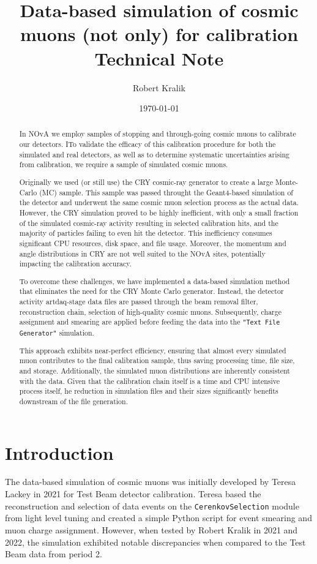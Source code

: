 \documentclass[12pt]{article}
\author{Robert Kralik}
\title{\textbf{Data-based simulation of cosmic muons (not only) for calibration\\ \vspace*{5mm}
\Large{Technical Note}}}
\date{\today}
\begin{document}
\maketitle
\begin{abstract}
In NOvA we employ samples of stopping and through-going cosmic muons to calibrate our detectors. ITo validate the efficacy of this calibration procedure for both the simulated and real detectors, as well as to determine systematic uncertainties arising from calibration, we require a sample of simulated cosmic muons.

Originally we used (or still use) the CRY cosmic-ray generator to create a large Monte-Carlo (MC) sample. This sample was passed throught the Geant4-based simulation of the detector and underwent the same cosmic muon selection process as the actual data. However, the CRY simulation proved to be highly inefficient, with only a small fraction of the simulated cosmic-ray activity resulting in selected calibration hits, and the majority of particles failing to even hit the detector. This inefficiency consumes significant CPU resources, disk space, and file usage. Moreover, the momentum and angle distributions in CRY are not well suited to the NOvA sites, potentially impacting the calibration accuracy.

To overcome these challenges, we have implemented a data-based simulation method that eliminates the need for the CRY Monte Carlo generator. Instead, the detector activity artdaq-stage data files are passed through the beam removal filter, reconstruction chain, selection of high-quality cosmic muons. Subsequently, charge assignment and smearing are applied before feeding the data into the \texttt{"Text File Generator"} simulation.

This approach exhibits near-perfect efficiency, ensuring that almost every simulated muon contributes to the final calibration sample, thus saving processing time, file size, and storage. Additionally, the simulated muon distributions are inherently consistent with the data. Given that the calibration chain itself is a time and CPU intensive process itself, he reduction in simulation files and their sizes significantly benefits downstream of the file generation.
\end{abstract}

\newpage
\tableofcontents

\section{Introduction}
The data-based simulation of cosmic muons was initially developed by Teresa Lackey in 2021 for Test Beam detector calibration. Teresa based the reconstruction and selection of data events on the \texttt{CerenkovSelection} module from light level tuning and created a simple Python script for event smearing and muon charge assignment. However, when tested by Robert Kralik in 2021 and 2022, the simulation exhibited notable discrepancies when compared to the Test Beam data from period 2.
\end{document}
